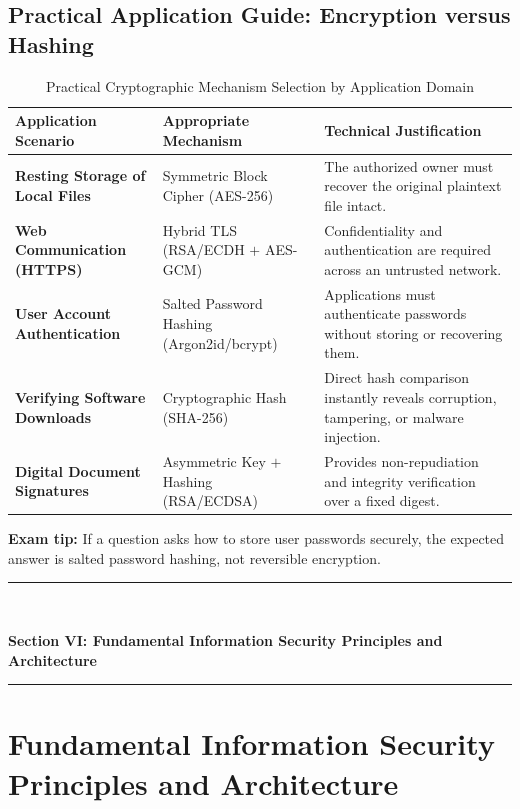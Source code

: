 \subsection{Practical Application Guide: Encryption versus Hashing}

\begin{table}[htbp]
\centering
\caption{Practical Cryptographic Mechanism Selection by Application Domain}
\label{tab:enc_vs_hash_apps}
\begin{tabularx}{\textwidth}{p{4.2cm} p{4.2cm} X}
\toprule
\textbf{Application Scenario} & \textbf{Appropriate Mechanism} & \textbf{Technical Justification} \\
\midrule
\textbf{Resting Storage of Local Files} & Symmetric Block Cipher (AES-256) & The authorized owner must recover the original plaintext file intact. \\
\textbf{Web Communication (HTTPS)} & Hybrid TLS (RSA/ECDH $+$ AES-GCM) & Confidentiality and authentication are required across an untrusted network. \\
\textbf{User Account Authentication} & Salted Password Hashing (Argon2id/bcrypt) & Applications must authenticate passwords without storing or recovering them. \\
\textbf{Verifying Software Downloads} & Cryptographic Hash (SHA-256) & Direct hash comparison instantly reveals corruption, tampering, or malware injection. \\
\textbf{Digital Document Signatures} & Asymmetric Key $+$ Hashing (RSA/ECDSA) & Provides non-repudiation and integrity verification over a fixed digest. \\
\bottomrule
\end{tabularx}
\end{table}


\textbf{Exam tip:} If a question asks how to store user passwords securely, the expected answer is salted password hashing, not reversible encryption.


\newpage
\begin{center}
\vspace{0.5em}
{\color{primary}\rule{0.45\textwidth}{1.2pt}\\[4pt]}
{\Large\bfseries\color{primary} Section VI: Fundamental Information Security Principles and Architecture\\[2pt]}
{\color{primary}\rule{0.45\textwidth}{1.2pt}}
\vspace{0.5em}
\end{center}

\section{Fundamental Information Security Principles and Architecture}


